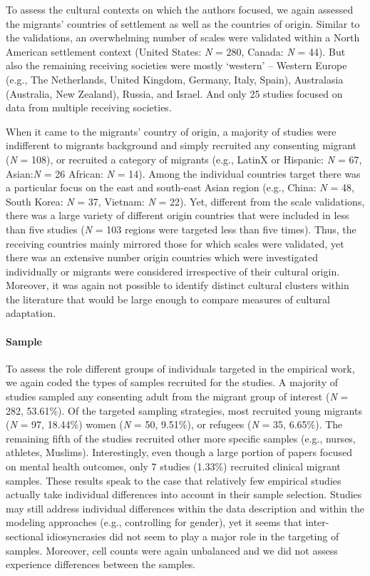 To assess the cultural contexts on which the authors focused, we again
assessed the migrants' countries of settlement as well as the countries
of origin. Similar to the validations, an overwhelming number of scales
were validated within a North American settlement context (United
States: \textit{N} = 280, Canada: \textit{N} = 44). But also the
remaining receiving societies were mostly `western' -- Western Europe
(e.g., The Netherlands, United Kingdom, Germany, Italy, Spain),
Australasia (Australia, New Zealand), Russia, and Israel. And only 25
studies focused on data from multiple receiving societies.

When it came to the migrants' country of origin, a majority of studies
were indifferent to migrants background and simply recruited any
consenting migrant (\textit{N} = 108), or recruited a category of
migrants (e.g., LatinX or Hispanic: \textit{N} = 67, Asian:\textit{N} =
26 African: \textit{N} = 14). Among the individual countries target
there was a particular focus on the east and south-east Asian region
(e.g., China: \textit{N} = 48, South Korea: \textit{N} = 37, Vietnam:
\textit{N} = 22). Yet, different from the scale validations, there was a
large variety of different origin countries that were included in less
than five studies (\textit{N} = 103 regions were targeted less than five
times). Thus, the receiving countries mainly mirrored those for which
scales were validated, yet there was an extensive number origin
countries which were investigated individually or migrants were
considered irrespective of their cultural origin. Moreover, it was again
not possible to identify distinct cultural clusters within the
literature that would be large enough to compare measures of cultural
adaptation.

\paragraph{Sample}

To assess the role different groups of individuals targeted in the
empirical work, we again coded the types of samples recruited for the
studies. A majority of studies sampled any consenting adult from the
migrant group of interest (\textit{N} = 282, 53.61\%). Of the targeted
sampling strategies, most recruited young migrants (\textit{N} = 97,
18.44\%) women (\textit{N} = 50, 9.51\%), or refugees (\textit{N} = 35,
6.65\%). The remaining fifth of the studies recruited other more
specific samples (e.g., nurses, athletes, Muslims). Interestingly, even
though a large portion of papers focused on mental health outcomes, only
7 studies (1.33\%) recruited clinical migrant samples. These results
speak to the case that relatively few empirical studies actually take
individual differences into account in their sample selection. Studies
may still address individual differences within the data description and
within the modeling approaches (e.g., controlling for gender), yet it
seems that inter-sectional idiosyncrasies did not seem to play a major
role in the targeting of samples. Moreover, cell counts were again
unbalanced and we did not assess experience differences between the
samples.

